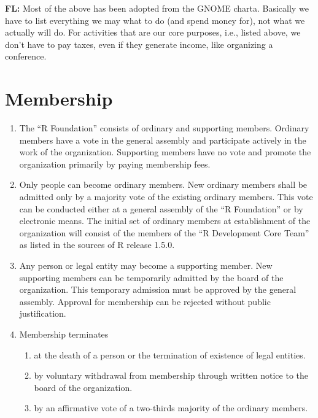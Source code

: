\documentclass[a4paper]{article}
\newcommand{\note}[2]{{\it \par\noindent\textbf{#1:} #2}}
\begin{document}
\note{FL}{Most of the above has been adopted from the GNOME charta.
  Basically we have to list everything we may what to do (and spend
  money for), not what we actually will do. For activities that are
  our core purposes, i.e., listed above, we don't have to pay taxes,
  even if they generate income, like organizing a conference.}

\section{Membership}

\begin{enumerate}
 \item The ``R Foundation'' consists of ordinary and supporting
  members.  Ordinary members have a vote in the general assembly and
  participate actively in the work of the organization. Supporting
  members have no vote and promote the organization primarily by
  paying membership fees.
  
 \item Only people can become ordinary members. New ordinary
  members shall be admitted only by a majority vote of the existing
  ordinary members. This vote can be conducted either at a general
  assembly of the ``R Foundation'' or by electronic means.  The
  initial set of ordinary members at establishment of the organization
  will consist of the members of the ``R Development Core Team'' as
  listed in the sources of R release 1.5.0.
  
 \item Any person or legal entity may become a supporting member.  New
  supporting members can be temporarily admitted by the board of the
  organization.  This temporary admission must be approved by the
  general assembly.  Approval for membership can be rejected without
  public justification.

 \item Membership terminates
  \begin{enumerate}
   \item at the death of a person or the termination of
    existence of legal entities.
   \item by voluntary withdrawal from membership through written
    notice to the board of the organization.
   \item by an affirmative vote of a two-thirds majority of the
    ordinary members. 
  \end{enumerate}
  
\end{enumerate}
   
\end{document}
